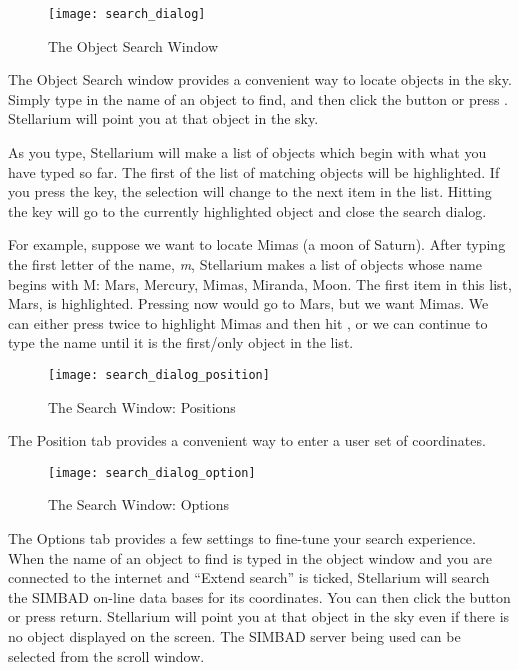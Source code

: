 \begin{figure}[h]
\centering\texttt{[image: search\_dialog]}
\caption{The Object Search Window}
\label{fig:interface:search}
\end{figure}

The Object Search window provides a convenient way to locate objects in
the sky. Simply type in the name of an object to find, and then click
the  button or press . Stellarium will point you at that
object in the sky.

As you type, Stellarium will make a list of objects which begin with
what you have typed so far. The first of the list of matching objects
will be highlighted. If you press the  key, the selection will change
to the next item in the list. Hitting the  key will go to the
currently highlighted object and close the search dialog.

For example, suppose we want to locate Mimas (a moon of Saturn). After
typing the first letter of the name, \emph{m}, Stellarium makes a list
of objects whose name begins with M: Mars, Mercury, Mimas, Miranda,
Moon. The first item in this list, Mars, is highlighted. Pressing 
now would go to Mars, but we want Mimas. We can either press  twice
to highlight Mimas and then hit , or we can continue to type the
name until it is the first/only object in the list.

\begin{figure}[h]
\centering\texttt{[image: search\_dialog\_position]}
\caption{The Search Window: Positions}
\label{fig:interface:search:position}
\end{figure}

The Position tab provides a convenient way to enter a user set
of coordinates.

\begin{figure}[h]
\centering\texttt{[image: search\_dialog\_option]}
\caption{The Search Window: Options}
\label{fig:interface:search:options}
\end{figure}

The Options tab provides a few settings to fine-tune your search experience.
When the name of an object to find is typed in the object
window and you are connected to the internet and ``Extend search'' is
ticked, Stellarium will search the SIMBAD on-line  data bases for its
coordinates. You can then click the  button or press return.
Stellarium will point you at that object in the sky even if there is no
object displayed on the screen. The SIMBAD server being used can be
selected from the scroll window.

